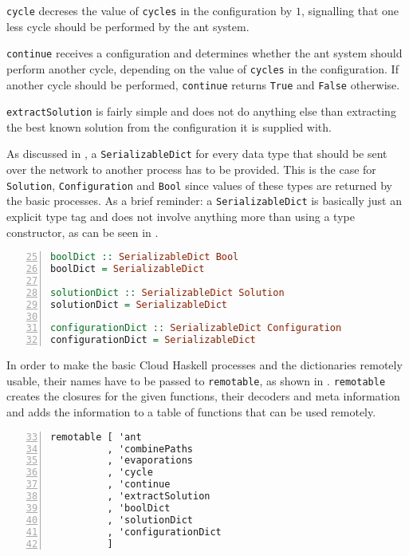 \texttt{cycle} decreses the value of \texttt{cycles} in the configuration by $1$, signalling that one less cycle should be performed by the ant system.

\texttt{continue} receives a configuration and determines whether the ant system should perform another cycle, depending on the value of \texttt{cycles} in the configuration. If another cycle should be performed, \texttt{continue} returns \texttt{True} and \texttt{False} otherwise.

\texttt{extractSolution} is fairly simple and does not do anything else than extracting the best known solution from the configuration it is supplied with.

As discussed in , a \texttt{SerializableDict} for every data type that should be sent over the network to another process has to be provided. This is the case for \texttt{Solution}, \texttt{Configuration} and \texttt{Bool} since values of these types are returned by the basic processes. As a brief reminder: a \texttt{SerializableDict} is basically just an explicit type tag and does not involve anything more than using a type constructor, as can be seen in .

\begin{lstlisting}[language=Haskell,frame=tb,numbers=left,label=lst:ant_dicts,caption=Dictionaries for data serialisation.,firstnumber=25]
boolDict :: SerializableDict Bool
boolDict = SerializableDict

solutionDict :: SerializableDict Solution
solutionDict = SerializableDict

configurationDict :: SerializableDict Configuration
configurationDict = SerializableDict
\end{lstlisting}

In order to make the basic \textsf{Cloud Haskell} processes and the dictionaries remotely usable, their names have to be passed to \texttt{remotable}, as shown in . \texttt{remotable} creates the closures for the given functions, their decoders and meta information and adds the information to a table of functions that can be used remotely.

\begin{lstlisting}[language=Haskell,frame=tb,numbers=left,firstnumber=33,label=lst:ant_remotable,caption=Making processes and dictionaries remotable.]
remotable [ 'ant
          , 'combinePaths
          , 'evaporations
          , 'cycle
          , 'continue
          , 'extractSolution
          , 'boolDict
          , 'solutionDict
          , 'configurationDict
          ]
\end{lstlisting}

